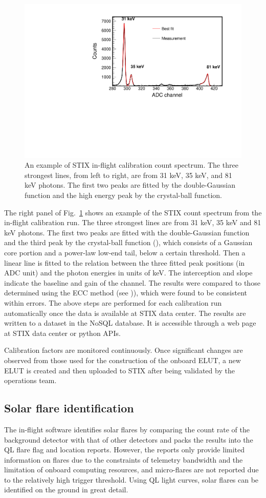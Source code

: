 \documentclass[referee]{aa} %
\begin{document}
\begin{figure}
 \centering
  \includegraphics[width=0.8\linewidth]{figures/cal-fit.pdf}
  \caption{An example of STIX in-flight calibration count spectrum.
  The three strongest lines, from left to right, are from 31 keV, 35 keV, and 81 keV
  photons. The first two peaks are fitted by the double-Gaussian function and the high energy peak by  
  the crystal-ball function. }
    \label{fig:cal-fit}
\end{figure}
The right panel of Fig.~\ref{fig:cal-fit} shows 
an example of the STIX count spectrum from the in-flight calibration run.  
The three strongest lines are from 31 keV, 35 keV and 81 keV photons. 
The first two peaks are fitted with the double-Gaussian function and the third peak
by the crystal-ball function (\cite{crsystallball}),  which consists of a Gaussian core portion 
and a power-law low-end tail, below a certain threshold.
Then a linear line is fitted to the relation between
the three fitted peak positions (in ADC unit) and the photon energies in units of keV.  
The interception and slope indicate the baseline and gain of the channel. 
The results were compared to those determined using the ECC method (see \cite{ecc,ecc2})), 
 which were found to be consistent within errors.
The above steps are performed for each calibration run automatically 
once the data is available at STIX data center.  The results are written to a
 dataset in the NoSQL database.  It is accessible through a web page at STIX data center or python APIs.

Calibration factors are monitored continuously. Once significant changes are 
observed from those used for the construction of  the onboard ELUT, 
 a new ELUT is created and then uploaded to STIX after being validated by the operations team. 

\subsection{Solar flare identification}
The in-flight software identifies solar flares by comparing  the count rate of 
the background detector with that of other detectors 
 and packs the results into the QL flare flag and location reports.
However,  the reports only provide limited information on flares due to the constraints of telemetry 
bandwidth and the limitation of onboard computing resources, and micro-flares are not 
reported due to the relatively high trigger threshold.
Using QL light curves, solar flares can be identified on the ground in great detail.
\end{document}
